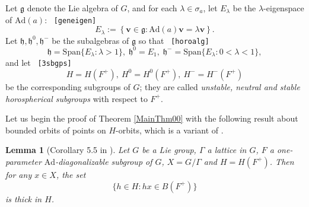 \documentclass[reqno,12pt]{amsart}
\newtheorem{lemma}[theorem]{Lemma}
\theoremstyle{definition}
\numberwithin{equation}{section}
\newcommand{\RR}{\mathbb{R}}
\newcommand{\CC}{\mathbb{C}}
\newcommand{\bv}{\mathbf{v}}
\newcommand{\Ad}{\mathrm{Ad}}
\newcommand{\Span}{\mathrm{Span}}
\newcommand{\Lg}{\mathfrak{g}}
\newcommand{\Lh}{\mathfrak{h}}
\newcommand {\new}[1]   {\textcolor{blue}{#1}}
\newif\ifdraft\drafttrue
\newcommand\eq[2]{{\ifdraft{\ \tt [#1]}\else\ignorespaces\fi}\begin{equation}\label{eq:#1}{#2}\end{equation}}
\newcommand\eqx[2]{{\ifdraft{\ \tt [#1]}\else\ignorespaces\fi}\begin{equation*}\label{eq:#1}{#2}\end{equation*}}
\begin{document}
{Let $\mathfrak{g}$ denote the Lie algebra of $G$, and for each $\lambda\in{\sigma_a}%
$, let $E_{\lambda}$ be the $\lambda$-eigenspace of $\Ad({a})$:
\eqx{geneigen}{E_\lambda:=\left\{\bv\in \Lg: \Ad({a})\bv=\lambda \bv\right\}.}
Let $\Lh,\Lh^0,\Lh^-$ be the subalgebras of $\Lg$ so that \eqx{horoalg}{\Lh=\Span\{E_{\lambda}: \lambda>1\},\;
\Lh^0=E_1,\;
\Lh^-=\Span\{E_{\lambda}: 0<\lambda<1\},}
{and let 
\eq{3sbgps}{H=H(F^+),\  H^0=H^0(F^+), \ H^-=H^-(F^+)}  be the corresponding subgroups of $G$; they are called \textit{unstable, neutral and stable horospherical subgroups} with respect to $F^+$.} 




Let us begin the proof of Theorem \ref{MainThm00} with 
the following result about bounded orbits of {points on %
$H$-orbits}, which is a variant of   \cite[Corollary 5.5]{KM96}.


    \begin{lemma}[Corollary 5.5 in \cite{KM96}]\label{L:KM1.5} {Let $G$ be a Lie group, $\Gamma$ a lattice in $G$, $F$ a one-parameter $\Ad$-diagonalizable subgroup of $G$,  $X=G/\Gamma$ and $H=H(F^+)$.} Then for any $x\in X$, the set $$
    \{h\in H:hx\in B(F^+)\}
    $$
    is thick in $H$.        
    \end{lemma}

}
\end{document}

